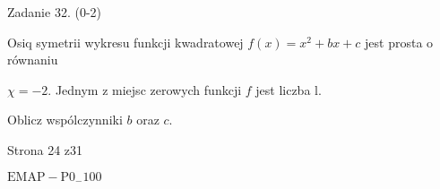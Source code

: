 \documentclass[a4paper,12pt]{article}
\begin{document}
Zadanie 32. (0-2)

Osiq symetrii wykresu funkcji kwadratowej $f(x)=x^{2}+bx+c$ jest prosta o równaniu

$\chi=-2$. Jednym z miejsc zerowych funkcji $f$ jest liczba l.

Oblicz wspólczynniki $b$ oraz $c.$

Strona 24 z31

$\mathrm{E}\mathrm{M}\mathrm{A}\mathrm{P}-\mathrm{P}0_{-}100$
\end{document}
